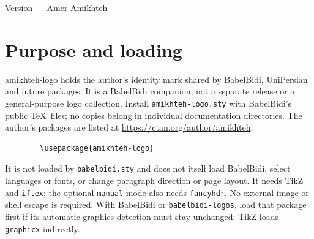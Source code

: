 \documentclass[a4paper]{ltxdoc}
\begin{document}
    \noindent
    \par\smallskip
    \noindent Version \quad---\quad
    \hfill Amer Amikhteh

    \section{Purpose and loading}
    \textsf{amikhteh-logo} holds the author's identity mark shared by
    BabelBidi, UniPersian and future packages. It is a BabelBidi companion,
    not a separate release or a general-purpose logo collection. Install
    \texttt{amikhteh-logo.sty} with BabelBidi's public \TeX\ files; no copies
    belong in individual documentation directories. The author's packages
    are listed at \url{https://ctan.org/author/amikhteh}.
    \begin{verbatim}
        \usepackage{amikhteh-logo}
    \end{verbatim}
    It is not loaded by \texttt{babelbidi.sty} and does not itself load
    BabelBidi, select languages or fonts, or change paragraph direction or
    page layout. It needs TikZ and \texttt{iftex}; the optional
    \texttt{manual} mode also needs \texttt{fancyhdr}. No external image or
    shell escape is required. With BabelBidi or \texttt{babelbidi-logos},
    load that package first if its automatic graphics detection must stay
    unchanged: TikZ loads \texttt{graphicx} indirectly.
\end{document}
